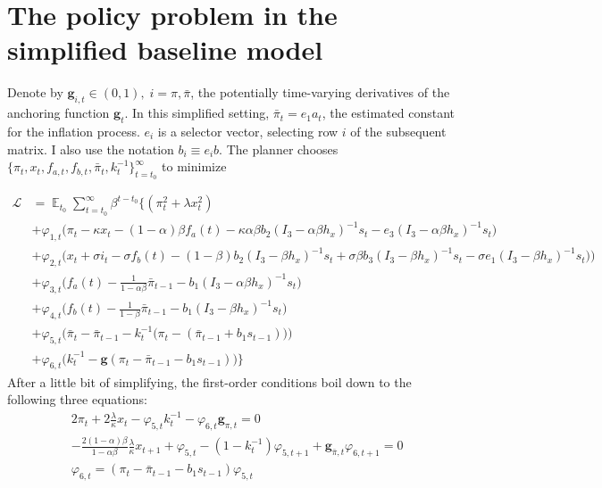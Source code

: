\documentclass[11pt]{article}
\renewcommand{\[}{\begin{equation}}
\renewcommand{\]}{\end{equation}}
\DeclareMathOperator{\E}{\mathbb{E}}
\begin{document}
\section{The policy problem in the simplified baseline model }\label{app_midsimple_problem}
Denote by $\mathbf{g}_{i,t} \in (0,1), \; i=\pi, \bar{\pi}$, the potentially time-varying derivatives of the anchoring function $\mathbf{g}_{t}$. In this simplified setting, $\bar{\pi}_t = e_1 a_t$, the estimated constant for the inflation process. $e_i$ is a selector vector, selecting row $i$ of the subsequent matrix. I also use the notation $b_i \equiv e_i b$.   The planner chooses $\{\pi_t, x_t, f_{a,t},  f_{b,t}, \bar{\pi}_t, k_t^{-1}\}_{t=t_0}^{\infty}$ to minimize

 \begin{align}
\mathcal{L} &= \E_{t_0}\sum_{t=t_0}^{\infty} \beta^{t-t_0}\bigg\{  (\pi_t^2  + \lambda x_t^2 )  \\
 & + \varphi_{1,t} \bigg(\pi_t - \kappa x_t -(1-\alpha)\beta f_a(t) -\kappa\alpha\beta b_2 (I_3 - \alpha\beta h_x)^{-1}s_t - e_3(I_3 - \alpha\beta h_x)^{-1}s_t \bigg) \label{midsimple_first}\\
 & + \varphi_{2,t} \bigg(x_t + \sigma i_t -\sigma f_b(t)  -  (1-\beta)b_2 (I_3 - \beta h_x)^{-1}s_t + \sigma\beta b_3 (I_3 - \beta h_x)^{-1}s_t -\sigma e_1(I_3 - \beta h_x)^{-1}s_t  \big)\bigg) \\
 & +  \varphi_{3,t}  \bigg(f_a(t) - \frac{1}{1-\alpha\beta}\bar{\pi}_{t-1}  - b_1(I_3 - \alpha\beta h_x)^{-1}s_t  \bigg) \\
 & + \varphi_{4,t}  \bigg(f_b(t) - \frac{1}{1-\beta}\bar{\pi}_{t-1}  - b_1(I_3 - \beta h_x)^{-1}s_t \bigg)  \\
  & + \varphi_{5,t}  \bigg(  \bar{\pi}_{t} - \bar{\pi}_{t-1} - k_t^{-1}\big(\pi_{t} -(\bar{\pi}_{t-1}+b_1 s_{t-1}) \big)   \bigg)  \\
  & + \varphi_{6,t}  \bigg(k_t^{-1} - \mathbf{g}(\pi_t - \bar{\pi}_{t-1}-b_1 s_{t-1})  \bigg)
  \bigg\} \label{midsimple_last}
\end{align}
After a little bit of simplifying, the first-order conditions boil down to the following three equations:
\begin{align}
& 2\pi_t + 2\frac{\lambda}{\kappa}x_t -\varphi_{5,t} k_t^{-1} - \varphi_{6,t} \mathbf{g}_{\pi,t} = 0 \label{gaspar22}\\
& -\frac{2(1-\alpha)\beta}{1-\alpha\beta}\frac{\lambda}{\kappa}x_{t+1} + \varphi_{5,t} -(1-k_t^{-1})\varphi_{5,t+1} +\mathbf{g}_{\bar{\pi},t}\varphi_{6,t+1} = 0 \label{gaspar21}\\
& \varphi_{6,t} = (\pi_t - \bar{\pi}_{t-1}-b_1 s_{t-1}) \varphi_{5,t} \label{constraints}
\end{align}
\end{document}
